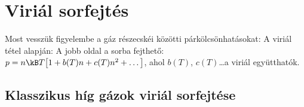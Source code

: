  \section{Viriál sorfejtés}
  
  Most vesszük figyelembe a gáz részecskéi közötti párkölcsönhatásokat:
  A viriál tétel alapján:
  A jobb oldal a sorba fejthető: $p=n\kB T\big[1+b(T)n+c(T)n^2+\dots\big]$, ahol $b(T)$, $c(T)$\dots a viriál együtthatók.
  
  \subsection{Klasszikus híg gázok viriál sorfejtése}
   
